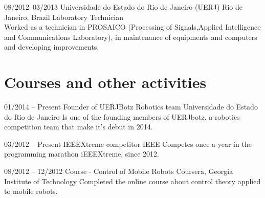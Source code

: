 \documentclass[]{friggeri-cv} %
\begin{document}
\begin{entrylist}
\entry
{08/2012--03/2013}
{\hspace{.15cm}Universidade do Estado do Rio de Janeiro (UERJ)}
{Rio de Janeiro, Brazil}
{Laboratory Technician \\
Worked as a technician in PROSAICO (Processing of Signals,Applied Intelligence and Communications Laboratory), in maintenance of equipments and computers and developing improvements.}

\end{entrylist}



\section{Courses and other activities}

\begin{entrylist}


\entry
{01/2014 -- Present}
{\hspace{.15cm}Founder of UERJBotz Robotics team}
{Universidade do Estado do Rio de Janeiro}
{Is one of the founding members of UERJbotz, a robotics competition team that make it's debut in 2014.}

\entry
{03/2012 -- Present}
{\hspace{.15cm}IEEEXtreme competitor}
{IEEE}
{Competes once a year in the programming marathon iEEEXtreme, since 2012.}

\entry
{08/2012 -- 12/2012}
{\hspace{.15cm}Course - Control of Mobile Robots}
{Coursera, Georgia Institute of Technology}
{Completed the online course about control theory applied to mobile robots.}







\end{entrylist}

\end{document}
